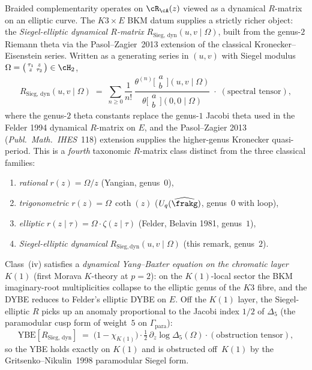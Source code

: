 \begin{remark}
\label{rem:brf-siegel-elliptic-dynamical-r-matrix}
Braided complementarity operates on $\cR_\cA(z)$ viewed as a
dynamical $R$-matrix on an elliptic curve. The $K3 \times E$ BKM
datum supplies a strictly richer object: the
\emph{Siegel-elliptic dynamical $R$-matrix}
$R_{\mathrm{Sieg,\,dyn}}(u, v \mid \Omega)$, built from the
genus-$2$ Riemann theta via the Pasol--Zagier~2013 extension of
the classical Kronecker--Eisenstein series. Written as a
generating series in $(u, v)$ with Siegel modulus
$\Omega = \bigl(\begin{smallmatrix} \tau_1 & z \\ z & \tau_2
\end{smallmatrix}\bigr) \in \cH_2$,
\[
 R_{\mathrm{Sieg,\,dyn}}(u, v \mid \Omega)
 \;=\; \sum_{n \geq 0} \frac{1}{n!}\,
 \frac{\theta^{(n)}\!\bigl[\begin{smallmatrix}a\\b\end{smallmatrix}\bigr]\!(u, v \mid \Omega)}{\theta\!\bigl[\begin{smallmatrix}a\\b\end{smallmatrix}\bigr]\!(0, 0 \mid \Omega)}
 \;\cdot\; (\text{spectral tensor}),
\]
where the genus-$2$ theta constants replace the genus-$1$ Jacobi
theta used in the Felder 1994 dynamical $R$-matrix on $E$, and the
Pasol--Zagier 2013 (\emph{Publ.~Math.~IHES}~118) extension supplies
the higher-genus Kronecker quasi-period. This is a \emph{fourth}
taxonomic $R$-matrix class distinct from the three classical
families:
\begin{enumerate}[label=\textup{(\roman*)}]
 \item \emph{rational} $r(z) = \Omega/z$ (Yangian, genus~$0$),
 \item \emph{trigonometric} $r(z) = \Omega\,\coth(z)$ ($U_q(\widehat{\frakg})$, genus~$0$ with loop),
 \item \emph{elliptic} $r(z \mid \tau) = \Omega\cdot \zeta(z \mid \tau)$ (Felder, Belavin 1981, genus~$1$),
 \item \emph{Siegel-elliptic dynamical} $R_{\mathrm{Sieg,dyn}}(u, v \mid \Omega)$ (this remark, genus~$2$).
\end{enumerate}
Class~(iv) satisfies a \emph{dynamical Yang--Baxter equation on the
chromatic layer $K(1)$} (first Morava $K$-theory at $p = 2$): on
the $K(1)$-local sector the BKM imaginary-root multiplicities
collapse to the elliptic genus of the $K3$ fibre, and the DYBE
reduces to Felder's elliptic DYBE on $E$. Off the $K(1)$ layer,
the Siegel-elliptic $R$ picks up an anomaly proportional to the
Jacobi index $1/2$ of $\Delta_5$ (the paramodular cusp form of
weight~$5$ on $\Gamma_{\mathrm{para}}$):
\[
 \text{YBE}\!\left[R_{\mathrm{Sieg,\,dyn}}\right]
 \;=\; \bigl(1 - \chi_{K(1)}\bigr) \cdot
 \tfrac{1}{2} \, \partial_z \log \Delta_5(\Omega) \cdot (\text{obstruction tensor}),
\]
so the YBE holds exactly on $K(1)$ and is obstructed off~$K(1)$ by
the Gritsenko--Nikulin~1998 paramodular Siegel form.


\end{remark}
